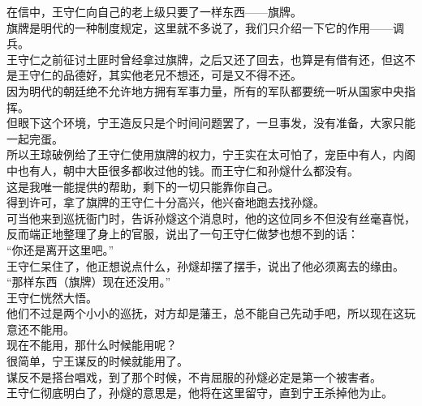 \begin{multicols}{\theparacolNo}
在信中，王守仁向自己的老上级只要了一样东西——旗牌。\\

旗牌是明代的一种制度规定，这里就不多说了，我们只介绍一下它的作用——调兵。\\

王守仁之前征讨土匪时曾经拿过旗牌，之后又还了回去，也算是有借有还，但这不是王守仁的品德好，其实他老兄不想还，可是又不得不还。\\

因为明代的朝廷绝不允许地方拥有军事力量，所有的军队都要统一听从国家中央指挥。\\

但眼下这个环境，宁王造反只是个时间问题罢了，一旦事发，没有准备，大家只能一起完蛋。\\

所以王琼破例给了王守仁使用旗牌的权力，宁王实在太可怕了，宠臣中有人，内阁中也有人，朝中大臣很多都收过他的钱。而王守仁和孙燧什么都没有。\\

这是我唯一能提供的帮助，剩下的一切只能靠你自己。\\

得到许可，拿了旗牌的王守仁十分高兴，他兴奋地跑去找孙燧。\\

可当他来到巡抚衙门时，告诉孙燧这个消息时，他的这位同乡不但没有丝毫喜悦，反而端正地整理了身上的官服，说出了一句王守仁做梦也想不到的话：\\

“你还是离开这里吧。”\\

王守仁呆住了，他正想说点什么，孙燧却摆了摆手，说出了他必须离去的缘由。\\

“那样东西（旗牌）现在还没用。”\\

王守仁恍然大悟。\\

他们不过是两个小小的巡抚，对方却是藩王，总不能自己先动手吧，所以现在这玩意还不能用。\\

现在不能用，那什么时候能用呢？\\

很简单，宁王谋反的时候就能用了。\\

谋反不是搭台唱戏，到了那个时候，不肯屈服的孙燧必定是第一个被害者。\\

王守仁彻底明白了，孙燧的意思是，他将在这里留守，直到宁王杀掉他为止。\\


\end{multicols}
